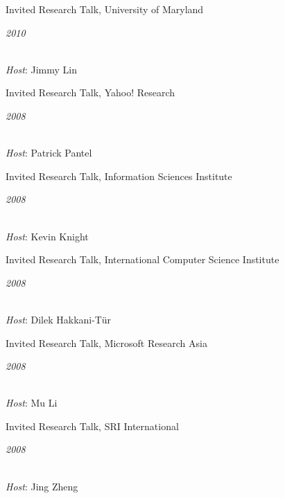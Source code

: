 \documentclass[margin,line]{res}
\newcommand{\dated}[2]{\parbox[t]{4.4in}{#1} \hspace{0.4in}
											 \parbox[t]{1in}{ {\it #2 } } }
\begin{document}
\begin{resume}
\dated{Invited Research Talk, University of Maryland}{2010} \\
{\em Host}: Jimmy Lin

\dated{Invited Research Talk, Yahoo! Research}{2008} \\
{\em Host}: Patrick Pantel

\dated{Invited Research Talk, Information Sciences Institute}{2008} \\
{\em Host}: Kevin Knight

\dated{Invited Research Talk, International Computer Science Institute}{2008} \\
{\em Host}: Dilek Hakkani-T\"{u}r

\dated{Invited Research Talk, Microsoft Research Asia}{2008} \\
{\em Host}: Mu Li

\dated{Invited Research Talk, SRI International}{2008} \\
{\em Host}: Jing Zheng

\end{resume}
\end{document}
